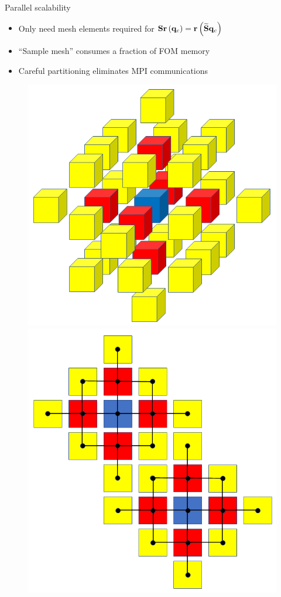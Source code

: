 \documentclass[]{beamer}
\begin{document}
\begin{frame}{Parallel scalability}
	\begin{itemize}
		\item Only need mesh elements required for $\mathbf{S} \mathbf{r}\left(\mathbf{q}_{c}\right) = \mathbf{r}\left(\mathbf{\widetilde{S}} \mathbf{q}_{c}\right)$
		\item ``Sample mesh'' consumes a fraction of FOM memory
		\item Careful partitioning eliminates MPI communications
	\end{itemize}
	\begin{figure}
		\centering
		\begin{minipage}{0.4\linewidth}
			\includegraphics[width=0.9\linewidth]{Images/theory/sampling_3d_2ndOrder.png}
		\end{minipage}
		\begin{minipage}{0.4\linewidth}
			\includegraphics[width=0.8\linewidth]{Images/theory/load_balancing_withEdgeCuts_noSyms.png}

\end{minipage}
\end{figure}
\end{frame}
\end{document}
